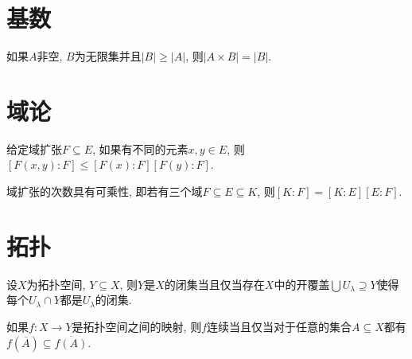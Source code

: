 
\section{基数}

\begin{proposition}\label{prop:cardcartcor}
    如果$A$非空, $B$为无限集并且$\vert B\vert\geq \vert A\vert$, 则$\vert A\times B\vert=\vert B\vert$.
\end{proposition}

\section{域论}

\begin{proposition}\label{thm:fntfieldextdegree}%
    给定域扩张$F\subseteq E$, 如果有不同的元素$x, y\in E$, 则$[F(x, y):F]\leq [F(x):F][F(y):F]$.
\end{proposition}

\begin{theorem}\label{thm:fieldextdegreemulti}%
    域扩张的次数具有可乘性, 即若有三个域$F\subseteq E\subseteq K$, 则$[K:F]=[K:E][E:F]$.
\end{theorem}

\section{拓扑}

\begin{proposition}\label{prop:closedsetlocal}
    设$X$为拓扑空间, $Y\subseteq X$, 则$Y$是$X$的闭集当且仅当存在$X$中的开覆盖$\bigcup U_\lambda\supseteq Y$使得每个$U_\lambda\cap Y$都是$U_\lambda$的闭集.
\end{proposition}

\begin{proposition}\label{prop:continuousimageclosure}
    如果$f\colon X\to Y$是拓扑空间之间的映射, 则$f$连续当且仅当对于任意的集合$A\subseteq X$都有$f(\overline{A})\subseteq\overline{f(A)}$.
\end{proposition}
